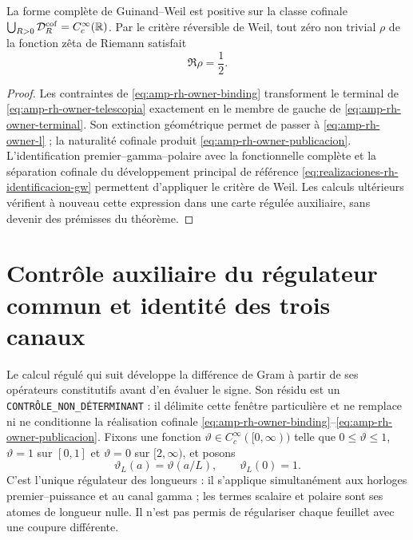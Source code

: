 \begin{theorem}
\label{thm:amp-rh-cierre-cofinal-propietario}
La forme complète de Guinand--Weil est positive sur la classe cofinale \(\bigcup_{R>0}\mathcal D_R^{\rm cof}=C_c^\infty(\mathbb R)\). Par le critère réversible de Weil, tout zéro non trivial \(\rho\) de la fonction zêta de Riemann satisfait
\[
 \Re\rho=\frac12.
\]
\end{theorem}

\begin{proof}
Les contraintes de \eqref{eq:amp-rh-owner-binding} transforment le terminal de \eqref{eq:amp-rh-owner-telescopia} exactement en le membre de gauche de \eqref{eq:amp-rh-owner-terminal}. Son extinction géométrique permet de passer à \eqref{eq:amp-rh-owner-l} ; la naturalité cofinale produit \eqref{eq:amp-rh-owner-publicacion}. L'identification premier--gamma--polaire avec la fonctionnelle complète et la séparation cofinale du développement principal de référence \eqref{eq:realizaciones-rh-identificacion-gw} permettent d'appliquer le critère de Weil. Les calculs ultérieurs vérifient à nouveau cette expression dans une carte régulée auxiliaire, sans devenir des prémisses du théorème.
\end{proof}

\section*{Contrôle auxiliaire du régulateur commun et identité des trois canaux}

Le calcul régulé qui suit développe la différence de Gram à partir de ses opérateurs constitutifs avant d'en évaluer le signe. Son résidu est un \texttt{CONTRÔLE\_NON\_DÉTERMINANT} : il délimite cette fenêtre particulière et ne remplace ni ne conditionne la réalisation cofinale \eqref{eq:amp-rh-owner-binding}--\eqref{eq:amp-rh-owner-publicacion}. Fixons une fonction \(\vartheta\in C_c^\infty([0,\infty))\) telle que \(0\leq\vartheta\leq1\), \(\vartheta=1\) sur \([0,1]\) et \(\vartheta=0\) sur \([2,\infty)\), et posons
\[
 \vartheta_L(a)=\vartheta(a/L),\qquad \vartheta_L(0)=1 .
\]
C'est l'unique régulateur des longueurs : il s'applique simultanément aux horloges premier--puissance et au canal gamma ; les termes scalaire et polaire sont ses atomes de longueur nulle. Il n'est pas permis de régulariser chaque feuillet avec une coupure différente.

